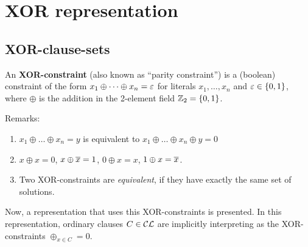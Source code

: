 \documentclass[12pt]{book}
\begin{document}
\chapter{XOR representation}
\label{cha:XOR-representation}

\section{XOR-clause-sets}
\label{sec:xor-cls}

\begin{defi}\label{def:xor-const} 
      \cite{h8} An \textbf{XOR-constraint} (also known as ``parity constraint'') is a (boolean) constraint of the form $x_1 \oplus \dots \oplus x_n = \varepsilon$ 
	  for literals $x_1, \dots, x_n$ and $\varepsilon \in \{ 0,1 \}$, where $\oplus$ is the addition in the 2-element field $\mathbb{Z}_2 = \{ 0,1 \}$. 
\end{defi}
Remarks:
\begin{enumerate}
      \item $x_1 \oplus \dots \oplus x_n = y$ is equivalent to $x_1 \oplus \dots \oplus x_n \oplus y = 0$
	  \item $x \oplus x = 0$, $x \oplus \overline{x} = 1$, $0 \oplus x = x$, $1 \oplus x = \overline{x}$.
	  \item Two XOR-constraints are \emph{equivalent}, if they have exactly the same set of solutions.
\end{enumerate}
Now, a representation that uses  this XOR-constraints is presented.	In this representation, ordinary clauses $C \in \mathcal{CL}$ are 
implicitly interpreting as the XOR-constraints $\oplus_{x \in C} = 0$.  
\end{document}
